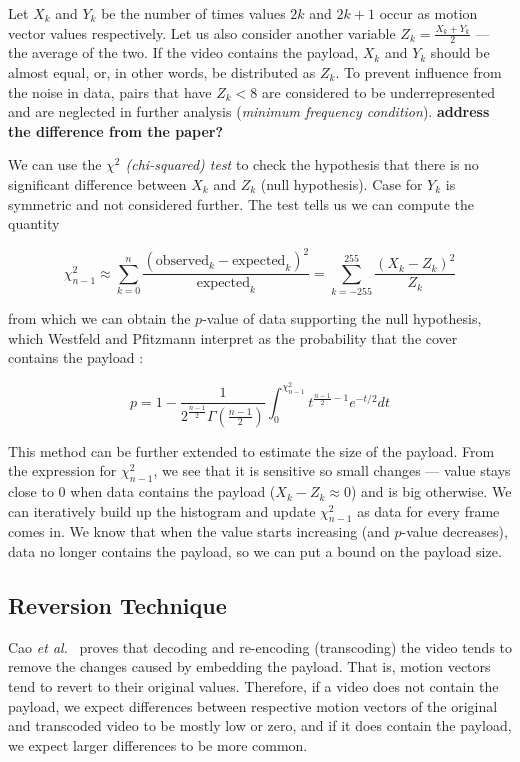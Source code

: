 \documentclass[12pt,british,twoside,notitlepage,usenames,dvipsnames,hypens,final]{report}
\numberwithin{equation}{section}
\numberwithin{figure}{section}
\begin{document}
Let $X_k$ and $Y_k$ be the number of times values $2k$ and $2k+1$ occur as motion vector values respectively. Let us also consider another variable $Z_k = \frac{X_k + Y_k}{2}$ --- the average of the two. If the video contains the payload, $X_k$ and $Y_k$ should be almost equal, or, in other words, be distributed as $Z_k$. To prevent influence from the noise in data, pairs that have $Z_k < 8$ are considered to be underrepresented and are neglected in further analysis (\emph{minimum frequency condition}). \textbf{address the difference from the paper?}

We can use the \emph{$\chi^2$ (chi-squared) test} to check the hypothesis that there is no significant difference between $X_k$ and $Z_k$ (null hypothesis). Case for $Y_k$ is symmetric and not considered further. The test tells us we can compute the quantity

$$ \chi^2_{n-1} \approx \sum^{n}_{k=0} \frac{(\text{observed}_k - \text{expected}_k)^2}{\text{expected}_k}= \sum^{255}_{k=-255} \frac{(X_k - Z_k)^2}{Z_k} $$ 

from which we can obtain the $p$-value of data supporting the null hypothesis, which Westfeld and Pfitzmann interpret as the probability that the cover contains the payload \cite{westfeld1999attacks}:

$$ p = 1 - \frac{1}{2^{\frac{n-1}{2}}\Gamma(\frac{n-1}{2})}\int_0^{\chi^2_{n-1}}t^{\frac{n-1}{2}−1}e^{-t/2}dt $$  

This method can be further extended to estimate the size of the payload. From the expression for $\chi^2_{n-1}$, we see that it is sensitive so small changes --- value stays close to 0 when data contains the payload ($X_k - Z_k \approx 0$) and is big otherwise. We can iteratively build up the histogram and update $\chi^2_{n-1}$ as data for every frame comes in. We know that when the value starts increasing (and $p$-value decreases), data no longer contains the payload, so we can put a bound on the payload size. 

\subsection{Reversion Technique}
Cao \emph{et al.}~\cite{cao2012video} proves that decoding and re-encoding (transcoding) the video tends to remove the changes caused by embedding the payload. That is, motion vectors tend to revert to their original values. Therefore, if a video does not contain the payload, we expect differences between respective motion vectors of the original and transcoded video to be mostly low or zero, and if it does contain the payload, we expect larger differences to be more common.
\end{document}
